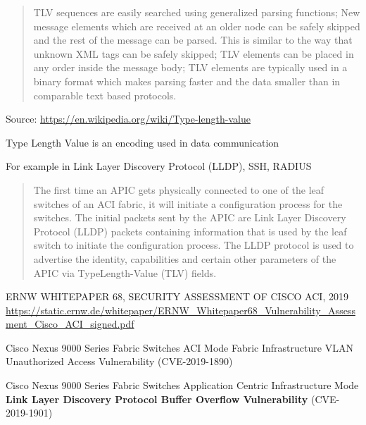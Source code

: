 \documentclass[Screen16to9,17pt]{foils}
\begin{document}

\begin{quote}
  TLV sequences are easily searched using generalized parsing functions;
New message elements which are received at an older node can be safely skipped and the rest of the message can be parsed. This is similar to the way that unknown XML tags can be safely skipped;
TLV elements can be placed in any order inside the message body;
TLV elements are typically used in a binary format which makes parsing faster and the data smaller than in comparable text based protocols.
\end{quote}
Source: \url{https://en.wikipedia.org/wiki/Type-length-value}

\begin{list2}
\item Type Length Value is an encoding used in data communication
\item For example in Link Layer Discovery Protocol (LLDP), SSH, RADIUS
\end{list2}




\begin{quote}
  The first time an APIC gets physically connected to one of the leaf switches of an ACI fabric, it will initiate a
  configuration process for the switches. The initial packets sent by the APIC are Link Layer Discovery Protocol
  (LLDP) packets containing information that is used by the leaf switch to initiate the configuration process. The
  LLDP protocol is used to advertise the identity, capabilities and certain other parameters of the APIC via TypeLength-Value (TLV) fields.
\end{quote}

ERNW WHITEPAPER 68, SECURITY ASSESSMENT OF CISCO ACI, 2019\\
{\footnotesize\url{https://static.ernw.de/whitepaper/ERNW_Whitepaper68_Vulnerability_Assessment_Cisco_ACI_signed.pdf}}


\begin{list2}
\item Cisco Nexus 9000 Series Fabric Switches ACI Mode Fabric Infrastructure VLAN\\
Unauthorized Access Vulnerability (CVE-2019-1890)
\item Cisco Nexus 9000 Series Fabric Switches Application Centric Infrastructure Mode\\
{\bf Link Layer Discovery Protocol Buffer Overflow Vulnerability} (CVE-2019-1901)
\end{list2}
\end{document}
